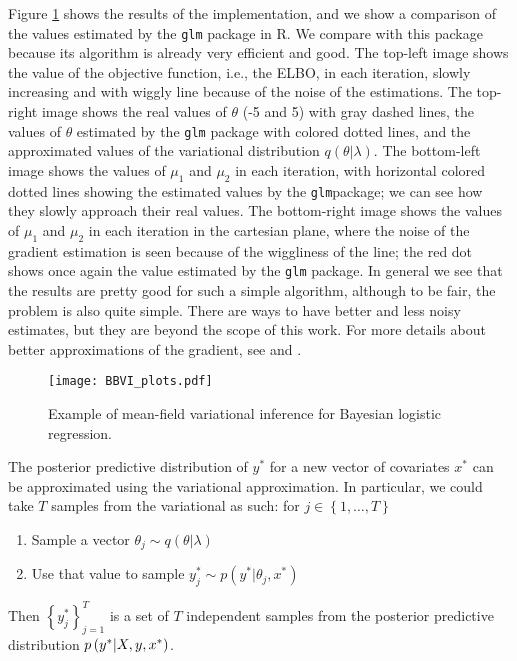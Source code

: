 Figure \ref{fig:BBVI_plots} shows the results of the implementation, and we show a comparison of the values estimated by the \texttt{glm} package in R. We compare with this package because its algorithm is already very efficient and good. The top-left image shows the value of the objective function, i.e., the ELBO, in each iteration, slowly increasing and with wiggly line because of the noise of the estimations. The top-right image shows the real values of $\theta$ (-5 and 5) with gray dashed lines, the values of $\theta$ estimated by the \texttt{glm} package with colored dotted lines, and the approximated values of the variational distribution $q(\theta | \lambda)$. The bottom-left image shows the values of $\mu_1$ and $\mu_2$ in each iteration, with horizontal colored dotted lines showing the estimated values by the \texttt{glm}package; we can see how they slowly approach their real values. The bottom-right image shows the values of $\mu_1$ and $\mu_2$ in each iteration in the cartesian plane, where the noise of the gradient estimation is seen because of the wiggliness of the line; the red dot shows once again the value estimated by the \texttt{glm} package. In general we see that the results are pretty good for such a simple algorithm, although to be fair, the problem is also quite simple. There are ways to have better and less noisy estimates, but they are beyond the scope of this work. For more details about better approximations of the gradient, see \cite{kucukelbir2017automatic} and \cite{ranganath2014black}.

\begin{figure}[H]
    \centering
    \texttt{[image: BBVI\_plots.pdf]}
    \caption{Example of mean-field variational inference for Bayesian logistic regression.}
    \label{fig:BBVI_plots}
\end{figure}

The posterior predictive distribution of $y^*$ for a new vector of covariates $x^*$ can be approximated using the variational approximation. In particular, we could take $T$ samples from the variational as such: for $j \in \left\{ 1, \ldots, T \right\}$


\begin{enumerate}
  \item Sample a vector $\theta_j \sim q(\theta | \lambda)$
  \item Use that value to sample $y_j^* \sim p(y^* | \theta_j, x^*)$
\end{enumerate}

Then $\left\{ y_j^* \right\}_{j = 1}^T$ is a set of $T$ independent samples from the posterior predictive distribution $p\left( y^* | X, y, x^* \right)$.

